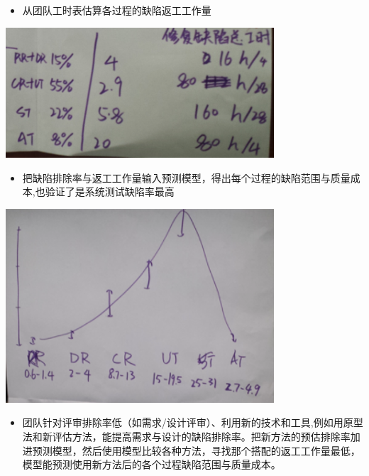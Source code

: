 \begin{itemize}
\tightlist
\item
  从团队工时表估算各过程的缺陷返工工作量
\end{itemize}


\includegraphics[width=10cm]{4reworkByPhaseScreenshot_2021-12-01_214838.png}

\begin{itemize}
\tightlist
\item
  把缺陷排除率与返工工作量输入预测模型，得出每个过程的缺陷范围与质量成本,也验证了是系统测试缺陷率最高
\end{itemize}


\includegraphics[width=10cm]{2AxtalBallPredictScreenshot_2021-12-01_212455.png}

\begin{itemize}
\tightlist
\item
  团队针对评审排除率低（如需求/设计评审）、利用新的技术和工具,例如用原型法和新评估方法，能提高需求与设计的缺陷排除率。把新方法的预估排除率加进预测模型，然后使用模型比较各种方法，寻找那个搭配的返工工作量最低，模型能预测使用新方法后的各个过程缺陷范围与质量成本。
\end{itemize}

